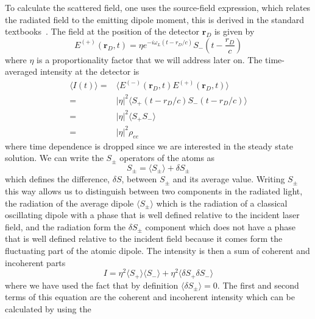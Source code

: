 \documentclass[11pt,letter]{article}
\newcommand{\bv}[1]{\ensuremath{\bm{#1}}}
\begin{document}
To calculate the scattered field, one uses the source-field expression, which
relates the radiated field to the emitting dipole moment, this is derived in
the standard textbooks~\cite{loudon2000quantum,cohen1998atom}.  The field at
the position of the detector $\bv{r}_{D}$ is given by
\begin{equation} 
    E^{(+)}( \bv{r}_{D}, t) = 
    \eta e^{- i \omega_{L} ( t -r_{D}/c) } 
    S_{-}\left(t - \frac{ r_{D} }{c} \right)
    \label{eq:source-field} 
\end{equation} where $\eta$
is a proportionality factor that we will address later on.  The time-averaged
intensity at the detector is 
\begin{equation}
\label{eq:Idef}
\begin{split}
\langle I (t) \rangle = & 
    \langle E^{(-)}(\bv{r}_{D}, t) E^{(+)}(\bv{r}_{D}, t) \rangle \\
   = & |\eta|^{2} \langle S_{+}(t-r_{D}/c)S_{-}(t-r_{D}/c) \rangle  \\
   = & |\eta|^{2} \langle S_{+}S_{-} \rangle \\
   = & |\eta|^{2} \rho_{ee}  
\end{split} 
\end{equation}
where time dependence is dropped since we are interested in the steady state
solution.  We can write the $S_{\pm}$ operators of the atoms as 
\begin{equation} 
    S_{\pm} = \langle S_{\pm} \rangle + \delta S_{\pm} 
\end{equation}
which defines the difference, $\delta S$, between $S_{\pm}$ and its average
value.   Writing $S_{\pm}$ this way allows us to distinguish between two
components in the radiated light,  the radiation of the average dipole $\langle
S_{\pm}\rangle$ which is the radiation of a classical oscillating dipole with a
phase that is well defined relative to the incident laser field, and the
radiation form the $\delta S_{\pm}$ component which does not have a phase that
is well defined relative to the incident field because it comes form the
fluctuating part of the atomic dipole.  The intensity is then a sum of coherent
and incoherent parts 
\begin{equation} 
I  = \eta^{2} \langle S_{+}\rangle \langle S_{-} \rangle 
   + \eta^{2} \langle \delta S_{+} \delta S_{-} \rangle 
\end{equation}
where we have used the fact that by definition $\langle \delta S_{\pm}
\rangle = 0$. The first and second terms of this equation are the coherent
and incoherent intensity which can be calculated by using the
\end{document}
